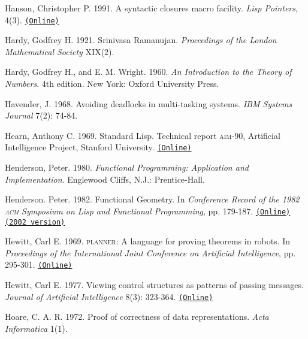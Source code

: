 \documentclass[8pt,oneside]{book}
\newcommand{\acronym}[1]{\textsc{\MakeLowercase{#1}}}
\newcommand{\code}[1]{\texttt{#1}}
\begin{document}
 \label{Hanson 1991}
Hanson, Christopher P.  1991.  A syntactic closures macro facility.  \textit{Lisp
Pointers}, 4(3).
\href{http://groups.csail.mit.edu/mac/ftpdir/scheme-reports/synclo.ps}{\code{(Online)}}

 \label{Hardy 1921}
Hardy, Godfrey H.  1921.  Srinivasa Ramanujan.  \textit{Proceedings of the London
Mathematical Society} XIX(2).

 \label{Hardy and Wright 1960}
Hardy, Godfrey H., and E. M. Wright.  1960.  \textit{An Introduction to the
Theory of Numbers}.  4th edition.  New York: Oxford University Press.

 \label{Havender (1968)}
Havender, J. 1968. Avoiding deadlocks in multi-tasking systems. \textit{IBM
Systems Journal} 7(2): 74-84.

 \label{Hearn 1969}
Hearn, Anthony C.  1969.  Standard Lisp.  Technical report \acronym{AIM}-90,
Artificial Intelligence Project, Stanford University.
\href{http://www.softwarepreservation.org/projects/LISP/stanford/Hearn-StandardLisp-AIM-90.pdf}{\code{(Online)}}

 \label{Henderson 1980}
Henderson, Peter. 1980.  \textit{Functional Programming: Application and
Implementation}. Englewood Cliffs, N.J.: Prentice-Hall.

 \label{Henderson 1982}
Henderson. Peter. 1982. Functional Geometry. In \textit{Conference Record of the
1982 \acronym{ACM} Symposium on Lisp and Functional Programming}, pp. 179-187.
\href{http://pmh-systems.co.uk/phAcademic/papers/funcgeo.pdf}{\code{(Online)}}
\href{http://eprints.soton.ac.uk/257577/1/funcgeo2.pdf}{\code{(2002 version)}}

 \label{Hewitt (1969)}
Hewitt, Carl E.  1969.  \acronym{PLANNER}: A language for proving
theorems in robots.  In \textit{Proceedings of the International Joint
Conference on Artificial Intelligence}, pp. 295-301.
\href{http://dspace.mit.edu/handle/1721.1/6171}{\code{(Online)}}

 \label{Hewitt (1977)}
Hewitt, Carl E.  1977.  Viewing control structures as patterns of passing
messages.  \textit{Journal of Artificial Intelligence} 8(3): 323-364.
\href{http://dspace.mit.edu/handle/1721.1/6272}{\code{(Online)}}

 \label{Hoare (1972)}
Hoare, C. A. R. 1972.  Proof of correctness of data representations.
\textit{Acta Informatica} 1(1).
\end{document}
